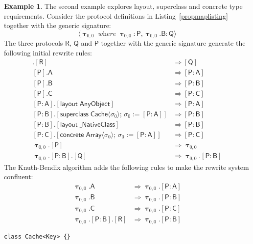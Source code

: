 \documentclass[a4paper,headsepline,bibliography=totoc,toc=flat,fleqn,twoside=semi]{scrbook}
\theoremstyle{definition}
\theoremstyle{definition}
\newtheorem{example}{Example}[chapter]
\theoremstyle{definition}
\newcommand{\namesym}[1]{\mathsf{#1}}
\newcommand{\proto}[1]{\bm{\mathsf{#1}}}
\newcommand{\protosym}[1]{[\proto{#1}]}
\newcommand{\gensig}[2]{\langle #1\;\textit{where}\;#2\rangle}
\newcommand{\genericsym}[2]{\bm{\uptau}_{#1,#2}}
\newcommand{\assocsym}[2]{[\proto{#1}\colon\namesym{#2}]}
\newcommand{\layoutsym}[1]{[\mathsf{layout\;#1}]}
\newcommand{\supersym}[1]{[\mathsf{superclass}\;#1]}
\newcommand{\concretesym}[1]{[\mathsf{concrete}\;#1]}
\begin{document}
\begin{example}\label{propmapexample3}
The second example explores layout, superclass and concrete type requirements. Consider the protocol definitions in Listing~\ref{propmaplisting} together with the generic signature:
\[\gensig{\genericsym{0}{0}}{\genericsym{0}{0}\colon\proto{P}, \genericsym{0}{0}.\namesym{B}\colon\proto{Q}}\]
The three protocols $\proto{R}$, $\proto{Q}$ and $\proto{P}$ together with the generic signature generate the following initial rewrite rules:
\begin{align*}
\protosym{Q}.\protosym{R}&\Rightarrow\protosym{Q}\tag{1}\\
\protosym{P}.\namesym{A}&\Rightarrow\assocsym{P}{A}\tag{2}\\
\protosym{P}.\namesym{B}&\Rightarrow\assocsym{P}{B}\tag{3}\\
\protosym{P}.\namesym{C}&\Rightarrow\assocsym{P}{C}\tag{4}\\
\assocsym{P}{A}.\layoutsym{AnyObject}&\Rightarrow\assocsym{P}{A}\tag{5}\\
\assocsym{P}{B}.\supersym{\namesym{Cache}\langle\sigma_0\rangle;\,\sigma_0:=\assocsym{P}{A}}&\Rightarrow\assocsym{P}{B}\tag{6}\\
\assocsym{P}{B}.\layoutsym{\_NativeClass}&\Rightarrow\assocsym{P}{B}\tag{7}\\
\assocsym{P}{C}.\concretesym{\namesym{Array}\langle\sigma_0\rangle;\,\sigma_0:=\assocsym{P}{A}}&\Rightarrow\assocsym{P}{C}\tag{8}\\
\genericsym{0}{0}.\protosym{P}&\Rightarrow\genericsym{0}{0}\tag{9}\\
\genericsym{0}{0}.\assocsym{P}{B}.\protosym{Q}&\Rightarrow\genericsym{0}{0}.\assocsym{P}{B}\tag{10}
\end{align*}
The Knuth-Bendix algorithm adds the following rules to make the rewrite system confluent:
\begin{align*}
\genericsym{0}{0}.\namesym{A}&\Rightarrow\genericsym{0}{0}.\assocsym{P}{A}\tag{11}\\
\genericsym{0}{0}.\namesym{B}&\Rightarrow\genericsym{0}{0}.\assocsym{P}{B}\tag{12}\\
\genericsym{0}{0}.\namesym{C}&\Rightarrow\genericsym{0}{0}.\assocsym{P}{C}\tag{13}\\
\genericsym{0}{0}.\assocsym{P}{B}.\protosym{R}&\Rightarrow\genericsym{0}{0}.\assocsym{P}{B}\tag{14}
\end{align*}
\begin{listing}\label{propmaplisting}
\begin{Verbatim}
class Cache<Key> {}


\end{Verbatim}
\end{listing}
\end{example}
\end{document}
